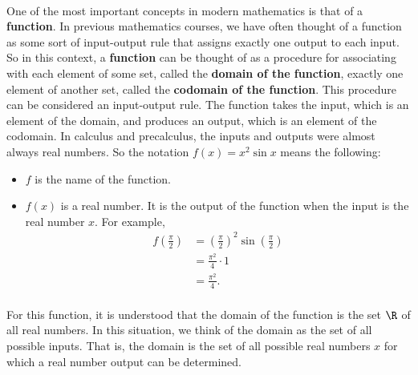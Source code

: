 \begin{previewactivity} \label{PA:previousfunctions} \hfill \\
One of the most important concepts in modern mathematics is that of a \textbf{function}.  In previous mathematics courses, we have often thought of a function as some sort of input-output rule that assigns exactly one output to each input.  So in this context, a \textbf{function}
%
 can be thought of as a procedure for associating with each element of some set, called the \textbf{domain of the function},
%
%
 exactly one element of another set, called the \textbf{codomain of the function}.
%
%
  This procedure can be considered an input-output rule.  The function takes the input, which is an element of the domain, and produces an output, which is an element of the codomain.  In calculus and precalculus, the inputs and outputs were almost always real numbers.  So the notation $f( x ) = x^2 \sin x$ means the following:

\begin{itemize}
\item $f$  is the name of the function.

\item $f( x )$  is a real number.  It is the output of the function when the input is the real number  $x$.  For example,
\[
\begin{aligned}
  f\left( {\frac{\pi }{2}} \right) &= \left( {\frac{\pi }{2}} \right)^2 \sin \left( {\frac{\pi }
{2}} \right) \\ 
                                   &= \frac{{\pi ^2 }}{4} \cdot 1 \\ 
                                   &= \frac{{\pi ^2 }}{4}. \\ 
\end{aligned}
\]
\end{itemize}
For this function, it is understood that the domain of the function is the set  $\R$ of all real numbers.  In this situation, we think of the domain as the set of all possible inputs.  That is, the domain is the set of all possible real numbers  $x$  for which a real number output can be determined.


\end{previewactivity}
